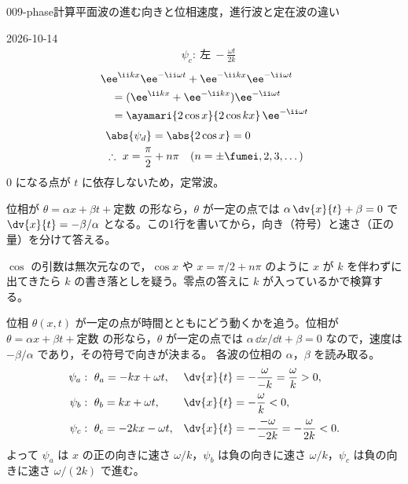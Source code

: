 \documentclass[uplatex,dvipdfmx,a4paper,11pt]{jsarticle}
\begin{document}
\begin{mondai}{009-phase}{計算}{平面波の進む向きと位相速度，進行波と定在波の違い}
\begin{kotaeutsushi}{2026-10-14}
\begin{align*}
&\psi_{c}:\ \text{左}\ -\frac{\omega t}{2k}
\end{align*}
\begin{align*}
&\ee^{\ii kx}\ee^{-\ii\omega t}+\ee^{-\ii kx}\ee^{-\ii\omega t}\\
&\quad=(\ee^{\ii kx}+\ee^{-\ii kx})\ee^{-\ii\omega t}\\
&\quad=\ayamari{2\cos x}{2\cos kx}\,\ee^{-\ii\omega t}
\end{align*}
\begin{align*}
&\abs{\psi_{d}}=\abs{2\cos x}=0\\
&\therefore\ x=\frac{\pi}{2}+n\pi\quad(n=\pm\fumei,2,3,\dots)
\end{align*}
$0$ になる点が $t$ に依存しないため，定常波。
\end{kotaeutsushi}
\begin{kizuki}
\item 位相が $\theta=\alpha x+\beta t+\text{定数}$ の形なら，$\theta$ が一定の点では $\alpha\,\dv{x}{t}+\beta=0$ で $\dv{x}{t}=-\beta/\alpha$ となる。この1行を書いてから，向き（符号）と速さ（正の量）を分けて答える。
\item $\cos$ の引数は無次元なので，$\cos x$ や $x=\pi/2+n\pi$ のように $x$ が $k$ を伴わずに出てきたら $k$ の書き落としを疑う。零点の答えに $k$ が入っているかで検算する。
\end{kizuki}
\begin{tadashii}
\houshin 位相 $\theta(x,t)$ が一定の点が時間とともにどう動くかを追う。位相が $\theta=\alpha x+\beta t+\text{定数}$ の形なら，$\theta$ が一定の点では $\alpha\,\dd x/\dd t+\beta=0$ なので，速度は $-\beta/\alpha$ であり，その符号で向きが決まる。
\keisan
{} 各波の位相の $\alpha$，$\beta$ を読み取る。
\begin{align*}
  \psi_{a}&:\ \theta_{a}=-kx+\omega t, & \dv{x}{t}&=-\frac{\omega}{-k}=\frac{\omega}{k}>0,\\
  \psi_{b}&:\ \theta_{b}=kx+\omega t, & \dv{x}{t}&=-\frac{\omega}{k}<0,\\
  \psi_{c}&:\ \theta_{c}=-2kx-\omega t, & \dv{x}{t}&=-\frac{-\omega}{-2k}=-\frac{\omega}{2k}<0.
\end{align*}
よって $\psi_{a}$ は $x$ の正の向きに速さ $\omega/k$，$\psi_{b}$ は負の向きに速さ $\omega/k$，$\psi_{c}$ は負の向きに速さ $\omega/(2k)$ で進む。


\end{tadashii}
\end{mondai}
\end{document}

